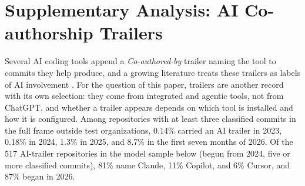 \documentclass[acmsmall,screen,review,anonymous]{acmart}
\begin{document}


\section{Supplementary Analysis: AI Co-authorship Trailers}
\label{app:trailers}

Several AI coding tools append a \textit{Co-authored-by} trailer naming the tool to commits they help produce, and a growing literature treats these trailers as labels of AI involvement \citep{khosravani2026census, quispe2026coding, liu2026debt, mao2026largescale, tufano2026selfadmitted}. For the question of this paper, trailers are another record with its own selection: they come from integrated and agentic tools, not from ChatGPT, and whether a trailer appears depends on which tool is installed and how it is configured. Among repositories with at least three classified commits in the full frame outside test organizations, 0.14\% carried an AI trailer in 2023, 0.18\% in 2024, 1.3\% in 2025, and 8.7\% in the first seven months of 2026. Of the 517 AI-trailer repositories in the model sample below (begun from 2024, five or more classified commits), 81\% name Claude, 11\% Copilot, and 6\% Cursor, and 87\% began in 2026.
\end{document}
